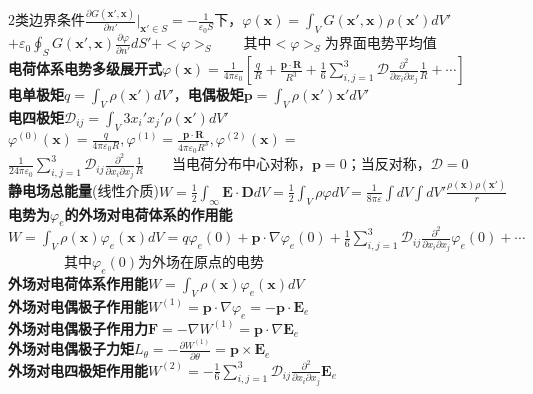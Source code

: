 \documentclass[10pt,a4paper]{article}
\begin{document}
\begin{multicols}{2}
$2$类边界条件$\frac{\partial G(\bm{x}',\bm{x})}{\partial n'}|_{\bm{x}'\in S}=-\frac{1}{\varepsilon_0S}$下，$\varphi(\bm{x})=\int_VG(\bm{x}',\bm{x})\rho(\bm{x}')dV'$\\
\indent\indent$+\varepsilon_0\oint_SG(\bm{x}',\bm{x})\frac{\partial\varphi}{\partial n'}dS'+<\varphi>_S$~~~~其中$<\varphi>_S$为界面电势平均值\scriptsize\\
\textbf{电荷体系电势多级展开式}$\varphi(\bm{x})=\frac{1}{4\pi\varepsilon_0}[\frac{q}{R}+\frac{\bm{p}\cdot\bm{R}}{R^3}+\frac{1}{6}\sum_{i,j=1}^3\mathcal{D}\frac{\partial^2}{\partial x_i\partial x_j}\frac{1}{R}+\cdots]$\\
\textbf{电单极矩}$q=\int_V\rho(\bm{x}')dV'$，\textbf{电偶极矩}$\bm{p}=\int_V\rho(\bm{x}')\bm{x}'dV'$\\
\indent\indent\textbf{电四极矩}$\mathcal{D}_{ij}=\int_V3x_i'x_j'\rho(\bm{x}')dV'$\\
$\varphi^{(0)}(\bm{x})=\frac{q}{4\pi\varepsilon_0R},\varphi^{(1)}=\frac{\bm{p}\cdot\bm{R}}{4\pi\varepsilon_0R^3},\varphi^{(2)}(\bm{x})=$\\
\indent\indent$\frac{1}{24\pi\varepsilon_0}\sum_{i,j=1}^3\mathcal{D}_{ij}\frac{\partial^2}{\partial x_i\partial x_j}\frac{1}{R}$~~~~当电荷分布中心对称，$\bm{p}=0$；当反对称，$\mathcal{D}=0$\\
\textbf{静电场总能量}(线性介质)$W=\frac{1}{2}\int_{\infty}\bm{E}\cdot\bm{D}dV=\frac{1}{2}\int_V\rho\varphi dV$\tiny$=\frac{1}{8\pi\varepsilon}\int dV\int dV'\frac{\rho(\bm{x})\rho(\bm{x}')}{r}$\scriptsize\\
\textbf{电势为$\varphi_e$的外场对电荷体系的作用能}$W=\int_V\rho(\bm{x})\varphi_e(\bm{x})dV=q\varphi_e(0)+\bm{p}\cdot\nabla\varphi_e(0)+\frac{1}{6}\sum_{i,j=1}^3\mathcal{D}_{ij}\frac{\partial^2}{\partial x_i\partial x_j}\varphi_e(0)+\cdots$~~~~~~~~其中$\varphi_e(0)$为外场在原点的电势\\
\textbf{外场对电荷体系作用能}$W=\int_V\rho(\bm{x})\varphi_e(\bm{x})dV$\\
\indent\textbf{外场对电偶极子作用能}$W^{(1)}=\bm{p}\cdot\nabla\varphi_e=-\bm{p}\cdot\bm{E}_e$\\
\indent\textbf{外场对电偶极子作用力}$\bm{F}=-\nabla W^{(1)}=\bm{p}\cdot\nabla\bm{E}_e$\\
\indent\textbf{外场对电偶极子力矩}$L_{\theta}=-\frac{\partial W^{(1)}}{\partial\theta}=\bm{p}\times\bm{E}_e$\\
\indent\textbf{外场对电四极矩作用能}$W^{(2)}=-\frac{1}{6}\sum_{i,j=1}^3\mathcal{D}_{ij}\frac{\partial^2}{\partial x_i\partial x_j}\bm{E}_e$
\end{multicols}
\end{document}
